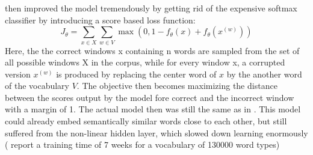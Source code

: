 \documentclass[11pt]{article}
\begin{document}
\cite{collobert2008unified} then improved the model tremendously by getting rid of the expensive softmax classifier by introducing a score based loss function: 
\begin{equation}
J_{\theta} = \sum_{x\in X}\sum_{w\in V}\max(0,1-f_{\theta}(x)+f_{\theta}(x^{(w)}))
\label{eq:bengio2006network_loss}
\end{equation}
Here, the the correct windows x containing n words are sampled from the set of all possible windows X in the corpus, while for every window x, a corrupted version $x^{(w)}$ is produced by replacing the center word of $x$ by the another word of the vocabulary $V$. The objective then becomes maximizing the distance between the scores output by the model fore correct and the incorrect window with a margin of 1. The actual model then was still the same as in \cite{bengio2003neural}. This model could already embed semantically similar words close to each other, but still suffered from the non-linear hidden layer, which slowed down learning enormously (\cite{bengio2003neural} report a training time of 7 weeks for a vocabulary of 130000 word types)
\end{document}

